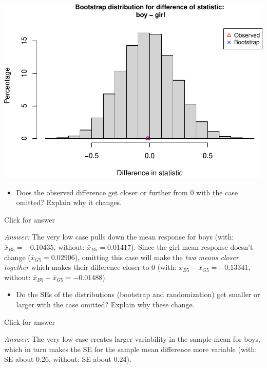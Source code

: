 \documentclass[
]{book}
\providecommand{\tightlist}{%
  \setlength{\itemsep}{0pt}\setlength{\parskip}{0pt}}
\begin{document}
\includegraphics[width=1\linewidth]{Class_Activity_13_files/figure-latex/unnamed-chunk-13-2}

\begin{itemize}
\tightlist
\item
  Does the observed difference get closer or further from 0 with the case omitted? Explain why it changes.
\end{itemize}

Click for answer

\emph{Answer:} The very low case pulls down the mean response for boys (with: \(\bar{x}_{B5} = -0.10435\), without: \(\bar{x}_{B5} = 0.01417\)). Since the girl mean response doesn't change (\(\bar{x}_{G5} = 0.02906\)), omitting this case will make the \emph{two means closer together} which makes their difference closer to 0 (with: \(\bar{x}_{B5} - \bar{x}_{G5} = -0.13341\), without: \(\bar{x}_{B5} - \bar{x}_{G5} = -0.01488\)).

\vspace*{.5in}

\begin{itemize}
\tightlist
\item
  Do the SEs of the distributions (bootstrap and randomization) get smaller or larger with the case omitted? Explain why these change.
\end{itemize}

Click for answer

\emph{Answer:} The very low case creates larger variability in the sample mean for boys, which in turn makes the SE for the sample mean difference more variable (with: SE about 0.26, without: SE about 0.24).

\vspace*{.5in}
\end{document}
